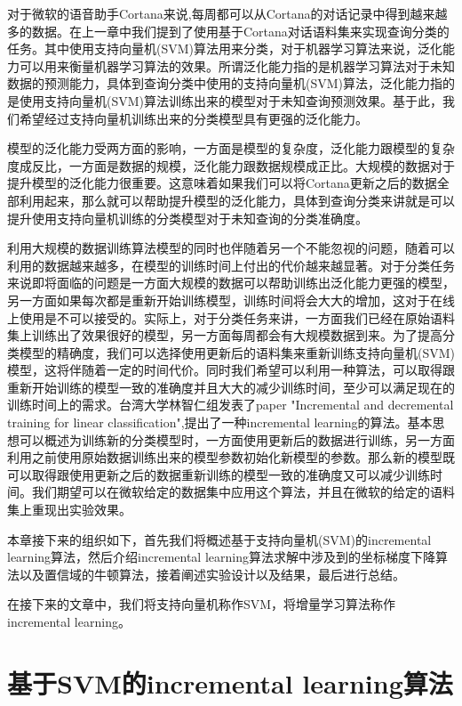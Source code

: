\documentclass[master]{njuthesis}
\begin{document}
\begin{enumerate}
\begin{enumerate}
\begin{enumerate}
   对于微软的语音助手Cortana来说,每周都可以从Cortana的对话记录中得到越来越多的数据。在上一章中我们提到了使用基于Cortana对话语料集来实现查询分类的任务。其中使用支持向量机(SVM)算法用来分类，对于机器学习算法来说，泛化能力可以用来衡量机器学习算法的效果。所谓泛化能力指的是机器学习算法对于未知数据的预测能力，具体到查询分类中使用的支持向量机(SVM)算法，泛化能力指的是使用支持向量机(SVM)算法训练出来的模型对于未知查询预测效果。基于此，我们希望经过支持向量机训练出来的分类模型具有更强的泛化能力。
   
   模型的泛化能力受两方面的影响，一方面是模型的复杂度，泛化能力跟模型的复杂度成反比，一方面是数据的规模，泛化能力跟数据规模成正比。大规模的数据对于提升模型的泛化能力很重要。这意味着如果我们可以将Cortana更新之后的数据全部利用起来，那么就可以帮助提升模型的泛化能力，具体到查询分类来讲就是可以提升使用支持向量机训练的分类模型对于未知查询的分类准确度。
   
   利用大规模的数据训练算法模型的同时也伴随着另一个不能忽视的问题，随着可以利用的数据越来越多，在模型的训练时间上付出的代价越来越显著。对于分类任务来说即将面临的问题是一方面大规模的数据可以帮助训练出泛化能力更强的模型，另一方面如果每次都是重新开始训练模型，训练时间将会大大的增加，这对于在线上使用是不可以接受的。实际上，对于分类任务来讲，一方面我们已经在原始语料集上训练出了效果很好的模型，另一方面每周都会有大规模数据到来。为了提高分类模型的精确度，我们可以选择使用更新后的语料集来重新训练支持向量机(SVM)模型，这将伴随着一定的时间代价。同时我们希望可以利用一种算法，可以取得跟重新开始训练的模型一致的准确度并且大大的减少训练时间，至少可以满足现在的训练时间上的需求。台湾大学林智仁组发表了paper "Incremental and decremental training for linear classification",提出了一种incremental learning的算法。基本思想可以概述为训练新的分类模型时，一方面使用更新后的数据进行训练，另一方面利用之前使用原始数据训练出来的模型参数初始化新模型的参数。那么新的模型既可以取得跟使用更新之后的数据重新训练的模型一致的准确度又可以减少训练时间。我们期望可以在微软给定的数据集中应用这个算法，并且在微软的给定的语料集上重现出实验效果。

   本章接下来的组织如下，首先我们将概述基于支持向量机(SVM)的incremental learning算法，然后介绍incremental learning算法求解中涉及到的坐标梯度下降算法以及置信域的牛顿算法，接着阐述实验设计以及结果，最后进行总结。

   在接下来的文章中，我们将支持向量机称作SVM，将增量学习算法称作incremental learning。

\section{基于SVM的incremental learning算法}


\end{enumerate}
\end{enumerate}
\end{enumerate}
\end{document}
